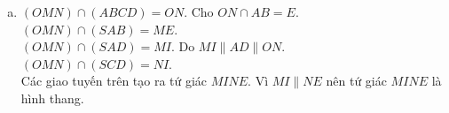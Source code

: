 \begin{bt}
\begin{bt}
{\begin{enumerate}[a.]
Ta có $\heva{&IH \parallel SA \\&HK \parallel AB\\& IH \cap HK = H}$ do đó $(IHK) \parallel(SAB)$.\\
Vậy $\heva{&IJ \subset(IHK) \\ &(IHK) \parallel(SAB)} \Rightarrow IJ \parallel(SAB)$.
\item $(OMN) \cap(ABCD)=ON$. Cho $ON \cap AB=E$.\\
$(OMN) \cap(SAB)=ME$.\\
$(OMN) \cap(SAD)=MI$. Do $MI \parallel AD \parallel ON$.\\
$(OMN) \cap(SCD)=NI$.\\
Các giao tuyến trên tạo ra tứ giác $MINE$. Vì $MI \parallel NE$ nên tứ giác $MINE$ là hình thang.
\end{enumerate}
}
\end{bt}


\end{bt}
